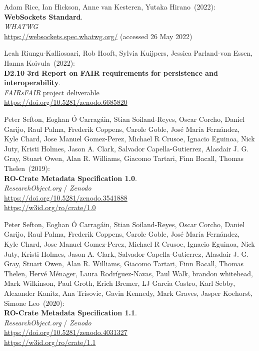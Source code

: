 \begin{thebibliography}{9}
Adam Rice, Ian Hickson, Anne van Kesteren, Yutaka Hirano~(2022): \\
\textbf{WebSockets Standard}. \\
\emph{WHATWG}\\
\url{https://websockets.spec.whatwg.org/}
(accessed 26 May 2022)

Leah Riungu-Kalliosaari, Rob Hooft, Sylvia Kuijpers, Jessica Parland-von Essen, Hanna Koivula~(2022): \\
\textbf{D2.10 3rd Report on FAIR requirements for persistence and interoperability}.\\
\emph{FAIRsFAIR} project deliverable \\
\url{https://doi.org/10.5281/zenodo.6685820}
   

Peter Sefton, Eoghan Ó Carragáin, Stian Soiland-Reyes, Oscar Corcho, Daniel Garijo, Raul Palma, Frederik Coppens, Carole Goble, José María Fernández, Kyle Chard, Jose Manuel Gomez-Perez, Michael R Crusoe, Ignacio Eguinoa, Nick Juty, Kristi Holmes, Jason A. Clark, Salvador Capella-Gutierrez, Alasdair J. G. Gray, Stuart Owen, Alan R. Williams, Giacomo Tartari, Finn Bacall, Thomas Thelen~(2019): \\
\textbf{RO-Crate Metadata Specification 1.0}.\\
\emph{ResearchObject.org} / \emph{Zenodo}\\
\url{https://doi.org/10.5281/zenodo.3541888}\\
\url{https://w3id.org/ro/crate/1.0}

Peter Sefton, Eoghan Ó Carragáin, Stian Soiland-Reyes, Oscar Corcho, Daniel Garijo, Raul Palma, Frederik Coppens, Carole Goble, José María Fernández, Kyle Chard, Jose Manuel Gomez-Perez, Michael R Crusoe, Ignacio Eguinoa, Nick Juty, Kristi Holmes, Jason A. Clark, Salvador Capella-Gutierrez, Alasdair J. G. Gray, Stuart Owen, Alan R. Williams, Giacomo Tartari, Finn Bacall, Thomas Thelen, Hervé Ménager, Laura Rodríguez-Navas, Paul Walk, brandon whitehead, Mark Wilkinson, Paul Groth, Erich Bremer, LJ Garcia Castro, Karl Sebby, Alexander Kanitz, Ana Trisovic, Gavin Kennedy, Mark Graves, Jasper Koehorst, Simone Leo~(2020): \\
\textbf{RO-Crate Metadata Specification 1.1}.\\
\emph{ResearchObject.org} / \emph{Zenodo}\\
\url{https://doi.org/10.5281/zenodo.4031327}\\
\url{https://w3id.org/ro/crate/1.1}


\end{thebibliography}

